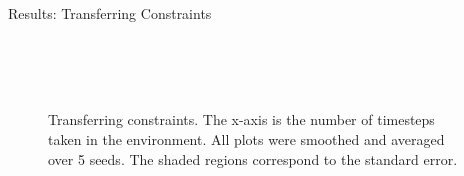\documentclass[t, pdf, aspectratio=169]{beamer}
\begin{document}
\begin{frame}{Results: Transferring Constraints}
\begin{figure}
\begin{center}
    \\
    \setcounter{subfigure}{0}
    \\
    \\
    \caption{\tiny{Transferring constraints. The x-axis is the number of timesteps taken in the environment. All plots were smoothed and averaged over 5 seeds. The shaded regions correspond to the standard error.}}
    \label{fig:transfer}
\end{center}
\end{figure}
\end{frame}
\end{document}
